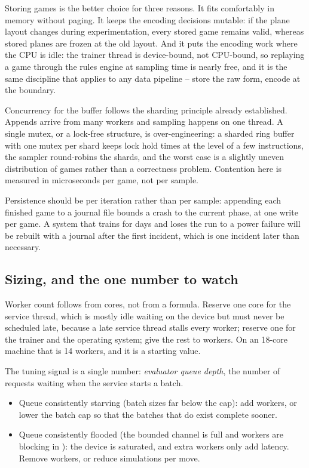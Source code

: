Storing games is the better choice for three reasons. It fits comfortably in
memory without paging. It keeps the encoding decisions mutable: if the plane
layout changes during experimentation, every stored game remains valid, whereas
stored planes are frozen at the old layout. And it puts the encoding work where
the CPU is idle: the trainer thread is device-bound, not CPU-bound, so replaying
a game through the rules engine at sampling time is nearly free, and it is the
same discipline that applies to any data pipeline -- store the raw form, encode
at the boundary.

Concurrency for the buffer follows the sharding principle already established.
Appends arrive from many workers and sampling happens on one thread. A single
mutex, or a lock-free structure, is over-engineering: a sharded ring buffer with
one mutex per shard keeps lock hold times at the level of a few instructions,
the sampler round-robins the shards, and the worst case is a slightly uneven
distribution of games rather than a correctness problem. Contention here is
measured in microseconds per game, not per sample.

Persistence should be per iteration rather than per sample: appending each
finished game to a journal file bounds a crash to the current phase, at one write
per game. A system that trains for days and loses the run to a power failure will
be rebuilt with a journal after the first incident, which is one incident later
than necessary.

\subsection{Sizing, and the one number to watch}
\label{sec:sizing}

Worker count follows from cores, not from a formula. Reserve one core for the
service thread, which is mostly idle waiting on the device but must never be
scheduled late, because a late service thread stalls every worker; reserve one
for the trainer and the operating system; give the rest to workers. On an
18-core machine that is 14 workers, and it is a starting value.

The tuning signal is a single number: \emph{evaluator queue depth}, the number of
requests waiting when the service starts a batch.

\begin{itemize}
  \item Queue consistently starving (batch sizes far below the cap): add workers,
        or lower the batch cap so that the batches that do exist complete sooner.
  \item Queue consistently flooded (the bounded channel is full and workers are
        blocking in ): the device is saturated, and extra workers only
        add latency. Remove workers, or reduce simulations per move.
\end{itemize}

